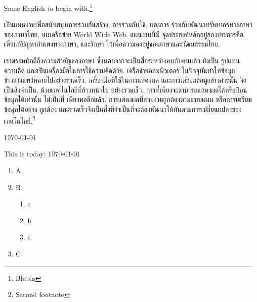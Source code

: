 \documentclass[a4paper]{article}
\begin{document}
\begin{center}
	\abstractname
\end{center}
\begin{english}
Some English to begin with.\footnote{ %
	Blabla}
\end{english}

เป็น\wbr แผนงานเพื่อ\wbr สนับสนุน\wbr การ\wbr ร่วมกัน\wbr สร้าง, การ\wbr ร่วมกันใช้, และ\wbr การ%
ร่วมกัน\wbr พัฒนา\wbr ทรัพยากร\wbr ทาง\wbr ภาษา\wbr ของ\wbr ภาษา\wbr ไทย, บน\wbr เครือข่าย World Wide Web. แผนงานนี้\wbr มี%
จุด\wbr ประสงค์หลั\wbr กอยู่\wbr สอง\wbr ประการคือ เพื่อแก้ปัญหา\wbr กำ\wbr แพง\wbr ทาง\wbr ภาษา, และรักษา%
ไว้เพื่อ\wbr ความค\wbr งอยู่\wbr ของ\wbr ภาษา\wbr และ\wbr วัฒนธรรม\wbr ไทย.

เรา\wbr ตระหนัก\wbr ดีถึง\wbr ความ\wbr สำคัญ\wbr ของ\wbr ภาษา ซึ่ง\wbr นอกจาก\wbr จะ\wbr เป็นสื่อ\wbr ระหว่าง\wbr คนกับ\wbr คน\wbr แล้ว ยัง\wbr เป็น%
รูปแทน\wbr ความคิด และ\wbr เป็น\wbr เครื่องมือ\wbr ใน\wbr การใช้\wbr ความคิด\wbr ด้วย. เครือข่าย\wbr คอมพิวเตอร์%
ใน\wbr ปัจจุบัน\wbr ทำให้ข้อมูล\wbr ข่าวสาร\wbr แพร่หลาย\wbr ไป\wbr อย่าง\wbr รวดเร็ว. เครื่องมือที่ใช้\wbr ใน\wbr การแส\wbr ดง\wbr ผล%
และ\wbr การเต\wbr รี\wbr ยมข้อมูล\wbr ข่าวสาร\wbr นั้น จึง\wbr เป็นสิ่ง\wbr จำ\wbr เป็น. ด้วย\wbr เทคโนโลยีที่\wbr ก้าวหน้า\wbr ไป%
อย่าง\wbr รวดเร็ว, การที่\wbr เพียง\wbr จะ\wbr สามารถแส\wbr ดง\wbr ผลได้หรือ\wbr ป้อนข้อมูลได้\wbr เท่านั้น ไม่\wbr เป็นที่%
เพียงพออีก\wbr แล้ว. การแส\wbr ดง\wbr ผลที่\wbr สวย\wbr งาม\wbr ถูก\wbr ต้อง\wbr ตาม\wbr แบบแผน หรือ\wbr การเต\wbr รี\wbr ยมข้อมูลได้\wbr อย่าง%
ถูก\wbr ต้อง และ\wbr รวดเร็วจึง\wbr เป็นสิ่งที่\wbr จำ\wbr เป็นที่\wbr จะ\wbr ต้อง\wbr พัฒนาให้\wbr ทันตาม\wbr การ\wbr เปลี่ยนแปลง\wbr ของ%
เทคโนโลยี.\footnote{ %
	Second footnote}

\today

\begin{english}
This is today: \today
\end{english}

\begin{enumerate}
	\item A
	\item B	
	\begin{enumerate}
		\item a
		\item b	
		\item c	
	\end{enumerate}
	\item C	
\end{enumerate}
\end{document}
